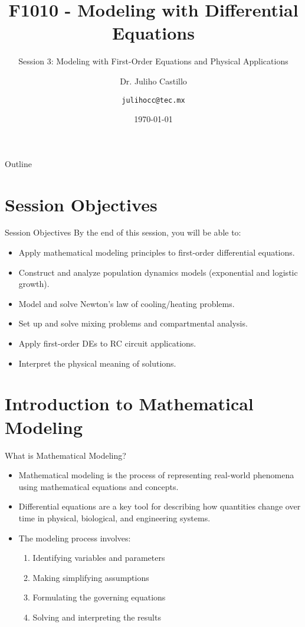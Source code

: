 \documentclass[10pt,aspectratio=169]{beamer}
\title{F1010 - Modeling with Differential Equations}
\subtitle{Session 3: Modeling with First-Order Equations and Physical Applications}
\author{Dr. Juliho Castillo \and \texttt{julihocc@tec.mx}}
\institute{Tec de Monterrey}
\date{\today}
\newcounter{problemcounter}
\begin{document}
\setcounter{problemcounter}{0}

\maketitle

\begin{frame}{Outline}
    \tableofcontents
\end{frame}

\section{Session Objectives}
\begin{frame}{Session Objectives}
    By the end of this session, you will be able to:
    \begin{itemize}
        \item Apply mathematical modeling principles to first-order differential equations.
        \item Construct and analyze population dynamics models (exponential and logistic growth).
        \item Model and solve Newton's law of cooling/heating problems.
        \item Set up and solve mixing problems and compartmental analysis.
        \item Apply first-order DEs to RC circuit applications.
        \item Interpret the physical meaning of solutions.
    \end{itemize}
\end{frame}

\section{Introduction to Mathematical Modeling}
\begin{frame}{What is Mathematical Modeling?}
    \begin{itemize}
        \item Mathematical modeling is the process of representing real-world phenomena using mathematical equations and concepts.
        \item Differential equations are a key tool for describing how quantities change over time in physical, biological, and engineering systems.
        \item The modeling process involves:
        \begin{enumerate}
            \item Identifying variables and parameters
            \item Making simplifying assumptions
            \item Formulating the governing equations
            \item Solving and interpreting the results
        \end{enumerate}
    \end{itemize}
\end{frame}
\end{document}
